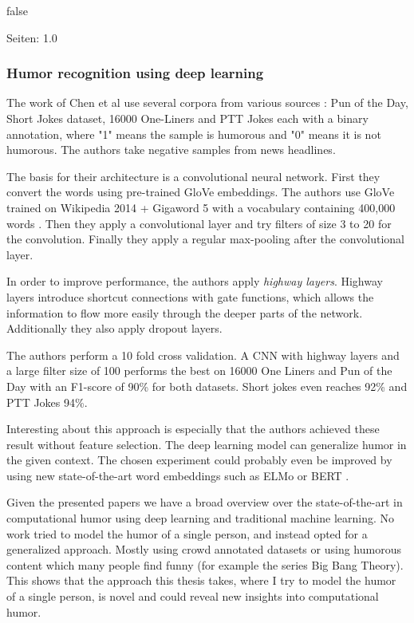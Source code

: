 \documentclass[draft,final,oneside]{vutinfth} %
\begin{document}
\if false
\cite{bertero2016long}

Seiten: 1.0
\fi

\subsubsection{Humor recognition using deep learning}

The work of Chen et al use several corpora from various sources \cite{chen2018humor}: Pun of the Day, Short Jokes dataset, 16000 One-Liners and PTT Jokes each with a binary annotation, where "1" means the sample is humorous and "0" means it is not humorous. The authors take negative samples from news headlines.

The basis for their architecture is a convolutional neural network. First they convert the words using pre-trained GloVe embeddings. The authors use GloVe trained on Wikipedia 2014 + Gigaword 5 with a vocabulary containing 400,000 words \cite{pennington2014glove}. Then they apply a convolutional layer and try filters of size 3 to 20 for the convolution. Finally they apply a regular max-pooling after the convolutional layer.

In order to improve performance, the authors apply \textit{highway layers}. Highway layers introduce shortcut connections with gate functions, which allows the information to flow more easily through the deeper parts of the network. Additionally they also apply dropout layers.

The authors perform a 10 fold cross validation. A CNN with highway layers and a large filter size of 100 performs the best on 16000 One Liners and Pun of the Day with an F1-score of 90\% for both datasets. Short jokes even reaches 92\% and PTT Jokes 94\%. 

Interesting about this approach is especially that the authors achieved these result without feature selection. The deep learning model can generalize humor in the given context. The chosen experiment could probably even be improved by using new state-of-the-art word embeddings such as ELMo or BERT \cite{elmo}\cite{bert}.

Given the presented papers we have a broad overview over the state-of-the-art in computational humor using deep learning and traditional machine learning. No work tried to model the humor of a single person, and instead opted for a generalized approach. Mostly using crowd annotated datasets or using humorous content which many people find funny (for example the series Big Bang Theory). This shows that the approach this thesis takes, where I try to model the humor of a single person, is novel and could reveal new insights into computational humor.
\end{document}
